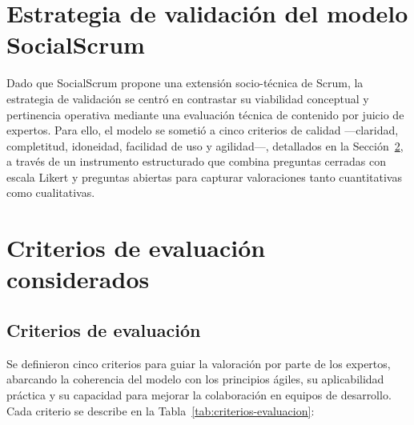 \section{Estrategia de validación del modelo SocialScrum}
Dado que SocialScrum propone una extensión socio-técnica de Scrum, la estrategia de validación se centró en contrastar su viabilidad conceptual y pertinencia operativa mediante una evaluación técnica de contenido por juicio de expertos. Para ello, el modelo se sometió a cinco criterios de calidad ---claridad, completitud, idoneidad, facilidad de uso y agilidad---, detallados en la Sección~\ref{sec:criterios-evaluacion}, a través de un instrumento estructurado que combina preguntas cerradas con escala Likert y preguntas abiertas para capturar valoraciones tanto cuantitativas como cualitativas.

\section{Criterios de evaluación considerados}
\label{sec:criterios-evaluacion}
\subsection{Criterios de evaluación}
Se definieron cinco criterios para guiar la valoración por parte de los expertos, abarcando la coherencia del modelo con los principios ágiles, su aplicabilidad práctica y su capacidad para mejorar la colaboración en equipos de desarrollo. Cada criterio se describe en la Tabla~\ref{tab:criterios-evaluacion}:

\begingroup
\scriptsize
\renewcommand{\arraystretch}{1.4}
\setlength{\tabcolsep}{3pt}

